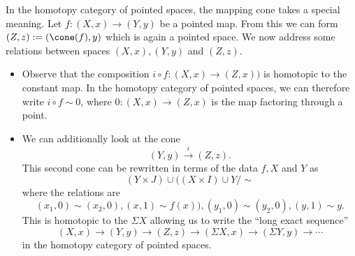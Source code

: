 
 
    In the homotopy category of pointed spaces, the mapping cone takes a special meaning. Let $f: (X,x)\to (Y, y)$ be a pointed map. From this we can form $(Z, z):=(\cone(f), y)$ which is again a pointed space. We now address some relations between spaces $(X, x), (Y, y)$ and $(Z, z)$.
\begin{itemize}
    \item Observe that the composition $i\circ f: (X, x)\to (Z, x))$ is homotopic to the constant map. In the homotopy category of pointed spaces, we can therefore write $i\circ f \sim 0$, where $0: (X, x)\to (Z, x)$ is the map factoring through a point.
    \item We can additionally look at the cone  
    \[(Y, y)\xrightarrow{i}(Z, z).\]
    This second cone can be rewritten in terms of the data $f, X$ and $Y$ as
    \[ (Y\times J)\cup ((X\times I)\cup Y / \sim\]
    where the relations are 
    \[(x_1, 0)\sim (x_2, 0) , (x, 1)\sim f(x)) , (y_1, 0)\sim (y_2, 0), (y, 1)\sim y.\]
    This is homotopic to the  $\Sigma X$ allowing us to write the ``long exact sequence''
    \[(X, x)\to (Y, y)\to (Z, z)\to (\Sigma X, x)\to (\Sigma Y, y)\to \cdots\]
    in the homotopy category of pointed spaces.
\end{itemize}

 